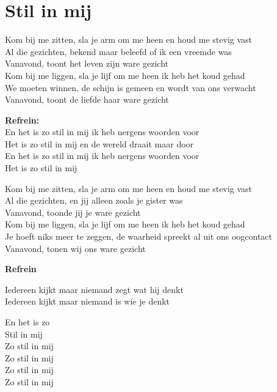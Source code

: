 \section{Stil in mij}
Kom bij me zitten, sla je arm om me heen en houd me stevig vast\\
Al die gezichten, bekend maar beleefd of ik een vreemde was\\
Vanavond, toont het leven zijn ware gezicht\\
Kom bij me liggen, sla je lijf om me heen ik heb het koud gehad\\
We moeten winnen, de schijn is gemeen en wordt van ons verwacht\\
Vanavond, toont de liefde haar ware gezicht

\textbf{Refrein:}\\
En het is zo stil in mij ik heb nergens woorden voor\\
Het is zo stil in mij en de wereld draait maar door\\
En het is zo stil in mij ik heb nergens woorden voor\\
Het is zo stil in mij

Kom bij me zitten, sla je arm om me heen en houd me stevig vast\\
Al die gezichten, en jij alleen zoals je gister was\\
Vanavond, toonde jij je ware gezicht\\
Kom bij me liggen, sla je lijf om me heen ik heb het koud gehad\\
Je hoeft niks meer te zeggen, de waarheid spreekt al uit ons oogcontact\\
Vanavond, tonen wij ons ware gezicht

\textbf{Refrein}

Iedereen kijkt maar niemand zegt wat hij denkt\\
Iedereen kijkt maar niemand is wie je denkt

En het is zo\\
Stil in mij\\
Zo stil in mij \\
Zo stil in mij \\
Zo stil in mij \\
Zo stil in mij 
